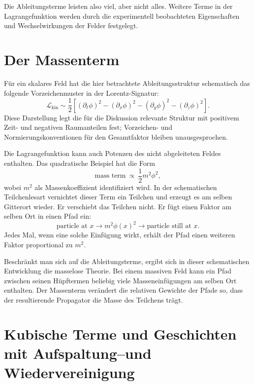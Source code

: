 Die Ableitungsterme leisten also viel, aber nicht alles. Weitere Terme in der Lagrangefunktion werden durch die experimentell beobachteten Eigenschaften und Wechselwirkungen der Felder festgelegt.

\section{Der Massenterm}

Für ein skalares Feld hat die hier betrachtete Ableitungsstruktur schematisch das folgende Vorzeichenmuster in der Lorentz-Signatur:
\begin{equation}
\mathcal{L}_{\mathrm{kin}}
\sim
\frac{1}{2}\left[
(\partial_t\phi)^2
-(\partial_x\phi)^2
-(\partial_y\phi)^2
-(\partial_z\phi)^2
\right].
\end{equation}
Diese Darstellung legt die für die Diskussion relevante Struktur mit positivem Zeit- und negativen Raumanteilen fest; Vorzeichen- und Normierungskonventionen für den Gesamtfaktor bleiben unausgesprochen.

Die Lagrangefunktion kann auch Potenzen des nicht abgeleiteten Feldes enthalten. Das quadratische Beispiel hat die Form
\begin{equation}
\text{mass term}\ \propto\ \frac{1}{2}m^2\phi^2,
\end{equation}
wobei \(m^2\) als Massenkoeffizient identifiziert wird. In der schematischen Teilchenlesart vernichtet dieser Term ein Teilchen und erzeugt es am selben Gitterort wieder. Er verschiebt das Teilchen nicht. Er fügt einen Faktor am selben Ort in einen Pfad ein:
\begin{equation}
\text{particle at }x
\longrightarrow
\boxed{m^2\phi(x)^2}
\longrightarrow
\text{particle still at }x.
\end{equation}
Jedes Mal, wenn eine solche Einfügung wirkt, erhält der Pfad einen weiteren Faktor proportional zu \(m^2\).

Beschränkt man sich auf die Ableitungsterme, ergibt sich in dieser schematischen Entwicklung die masselose Theorie. Bei einem massiven Feld kann ein Pfad zwischen seinen Hüpftermen beliebig viele Masseneinfügungen am selben Ort enthalten. Der Massenterm verändert die relativen Gewichte der Pfade so, dass der resultierende Propagator die Masse des Teilchens trägt.

\section{Kubische Terme und Geschichten mit Aufspaltung--und Wiedervereinigung}

